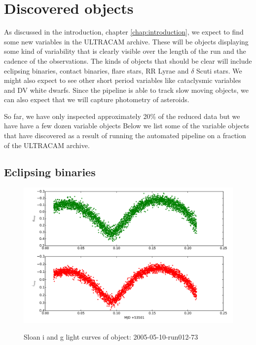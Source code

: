 \section{Discovered objects}
As discussed in the introduction, chapter \ref{chap:introduction}, we expect to find some new variables in the ULTRACAM archive. These will be objects displaying some kind of variability that is clearly visible over the length of the run and the cadence of the observations. The kinds of objects that should be clear will include eclipsing binaries, contact binaries, flare stars, RR Lyrae and $\delta$ Scuti stars. We might also expect to see other short period variables like cataclysmic variables and DV white dwarfs. Since the pipeline is able to track slow moving objects, we can also expect that we will capture photometry of asteroids.   

So far, we have only inspected approximately 20\% of the reduced data but we have have a few dozen variable objects
Below we list some of the variable objects that have discovered as a result of running the automated pipeline on a fraction of the ULTRACAM archive. 

\newpage
\subsection{Eclipsing binaries}

  \begin{figure}
    \includegraphics[width=120mm]{images/2005-05-10-run012-73-lightcurve-cropped.png} 
    \label{fig:2005-05-10-run012}
    \caption{Sloan i and g light curves of object: 2005-05-10-run012-73}
  \end{figure}
  
